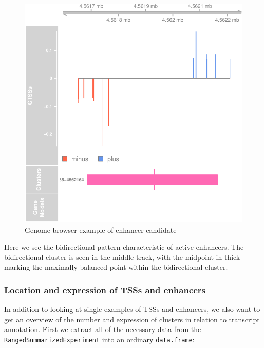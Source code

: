 \documentclass[9pt,a4paper,]{extarticle}
\newenvironment{Shaded}{\begin{snugshade}}{\end{snugshade}}
\newcommand{\KeywordTok}[1]{\textcolor[rgb]{0.13,0.29,0.53}{\textbf{{#1}}}}
\newcommand{\StringTok}[1]{\textcolor[rgb]{0.31,0.60,0.02}{{#1}}}
\newcommand{\NormalTok}[1]{{#1}}
\begin{document}
\begin{figure}

{\centering \includegraphics{CAGEWorkflow_files/figure-latex/simpleEnhancer-1} 

}

\caption{Genome browser example of enhancer candidate}\label{fig:simpleEnhancer}
\end{figure}

Here we see the bidirectional pattern characteristic of active enhancers. The bidirectional cluster is seen in the middle track, with the midpoint in thick marking the maximally balanced point within the bidirectional cluster.

\subsubsection{Location and expression of TSSs and enhancers}\label{location-and-expression-of-tsss-and-enhancers}

In addition to looking at single examples of TSSs and enhancers, we also want to get an overview of the number and expression of clusters in relation to transcript annotation. First we extract all of the necessary data from the \texttt{RangedSummarizedExperiment} into an ordinary \texttt{data.frame}:

\begin{Shaded}
\end{Shaded}
\end{document}
